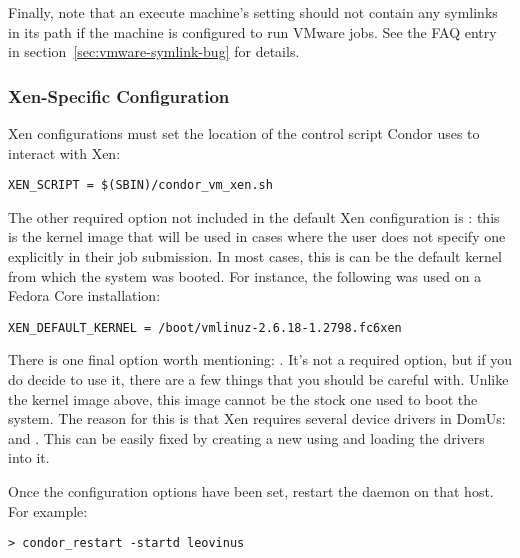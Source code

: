 Finally, note that an execute machine's  setting should not
contain any symlinks in its path if the machine is configured to run VMware
jobs. See the FAQ entry in section~\ref{sec:vmware-symlink-bug} for details.

\subsubsection{Xen-Specific Configuration}

Xen configurations must set the location of the control script Condor
uses to interact with Xen:

\begin{verbatim}
XEN_SCRIPT = $(SBIN)/condor_vm_xen.sh
\end{verbatim}

The other required option not included in the default Xen configuration is
: this is the kernel image that will be used
in cases where the user does not specify one explicitly in their job
submission.  In most cases, this is can be the default kernel from which
the system was booted.  For instance, the following was used on a Fedora
Core installation:

\begin{verbatim}
XEN_DEFAULT_KERNEL = /boot/vmlinuz-2.6.18-1.2798.fc6xen
\end{verbatim}

There is one final option worth mentioning: .  
It's not a required option, but if you do decide to use it, there are a 
few things that you should be careful with.  Unlike the kernel image above,
this image cannot be the stock one used to boot the system.  The reason
for this is that Xen requires several device drivers in DomUs:  
and .  This can be easily fixed by creating a new 
using  and loading the drivers into it.


Once the configuration options have been set, restart the  
daemon on that host.  For example:

\begin{verbatim}
> condor_restart -startd leovinus
\end{verbatim}

